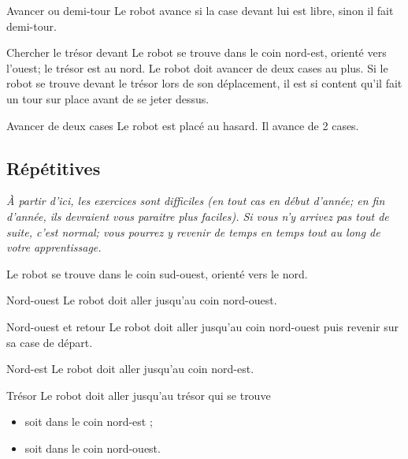 		\begin{Exercice}{Avancer ou demi-tour}
			Le robot avance si la case devant lui est libre,
			sinon il fait demi-tour.
		\end{Exercice}

		\begin{Exercice}{Chercher le trésor devant}
			Le robot se trouve dans le coin nord-est, orienté vers
			l'ouest; le trésor est au nord. Le robot doit avancer
			de deux cases au plus. Si le robot se trouve devant le trésor lors de
			son déplacement, il est si content qu'il fait un tour
			sur place avant de se jeter dessus.
		\end{Exercice}

		\begin{Exercice}{Avancer de deux cases}
			Le robot est placé au hasard. Il avance de 2 cases.
		\end{Exercice}


	\subsection{Répétitives}

		\emph{%
		À partir d'ici, les exercices sont difficiles
		(en tout cas en début d'année; en fin d'année,
		ils devraient vous paraitre plus faciles).
		Si vous n'y arrivez pas tout de suite, c'est normal; 
		vous pourrez y revenir de temps en temps 
		tout au long de votre apprentissage.
		}

		Le robot se trouve dans le coin sud-ouest, orienté vers le nord.

		\begin{Exercice}{Nord-ouest}
			Le robot doit aller jusqu'au coin nord-ouest.
		\end{Exercice}

		\begin{Exercice}{Nord-ouest et retour}
			Le robot doit aller jusqu'au coin nord-ouest
			puis revenir sur sa case de départ.
		\end{Exercice}

		\begin{Exercice}{Nord-est}
			Le robot doit aller jusqu'au coin nord-est.
		\end{Exercice}

		\begin{Exercice}{Trésor}
			Le robot doit aller jusqu'au trésor qui se trouve
			\begin{itemize}
			\item soit dans le coin nord-est ;
			\item soit dans le coin nord-ouest.
			\end{itemize}
		\end{Exercice}

